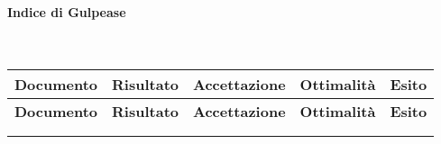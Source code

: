 \paragraph{Indice di Gulpease}\mbox{}\\
\begin{longtable}{|c|c|c|c|c|}
	\hline \multicolumn{1}{|c|}{\textbf{Documento}} & \multicolumn{1}{c|}{\textbf{Risultato}} & \multicolumn{1}{c|}{\textbf{Accettazione}} & \multicolumn{1}{c|}{\textbf{Ottimalità}} & \multicolumn{1}{c|}{\textbf{Esito}}\\
	\hline 
	\endfirsthead
	
	\hline \multicolumn{1}{|c|}{\textbf{Documento}} & \multicolumn{1}{c|}{\textbf{Risultato}} & \multicolumn{1}{c|}{\textbf{Accettazione}} & \multicolumn{1}{c|}{\textbf{Ottimalità}} & \multicolumn{1}{c|}{\textbf{Esito}}\\
	\hline 
	\endhead
	
	\hline \multicolumn{5}{|r|}{\ToBeContinued} \\ 
	\hline
	\endfoot
	
	\hline
	\endlastfoot
	

\end{longtable}
